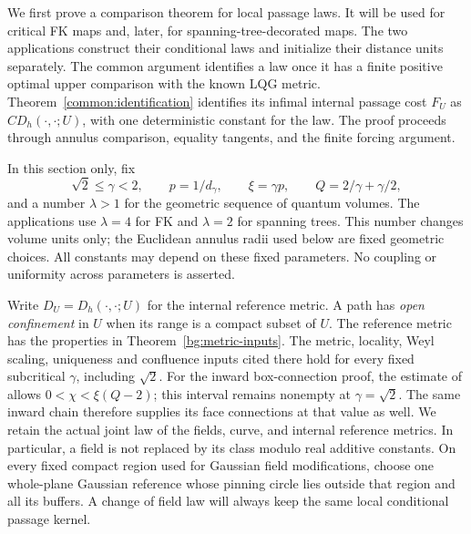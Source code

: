 We first prove a comparison theorem for local passage laws.  It will be
used for critical FK maps and, later, for spanning-tree-decorated maps.
The two applications construct their conditional laws and initialize their
distance units separately.  The common argument identifies a law once it
has a finite positive optimal upper comparison with the known LQG metric.
Theorem~\ref{common:identification} identifies its infimal internal
passage cost $F_U$ as $C D_h(\cdot,\cdot;U)$, with one deterministic
constant for the law. The proof proceeds through annulus comparison,
equality tangents, and the finite forcing argument.

In this section only, fix
\[
 \sqrt2\le\gamma<2,\qquad p=1/d_\gamma,\qquad
 \xi=\gamma p,\qquad Q=2/\gamma+\gamma/2,
\]
and a number $\lambda>1$ for the geometric sequence of quantum volumes.
The applications use $\lambda=4$ for FK and $\lambda=2$ for spanning
trees.  This number changes volume units only; the Euclidean annulus
radii used below are fixed geometric choices.  All constants may depend
on these fixed parameters.  No coupling or uniformity across parameters
is asserted.

Write $D_U=D_h(\cdot,\cdot;U)$ for the internal reference metric.
A path has \emph{open confinement} in $U$ when its range is a compact
subset of $U$.  The reference metric has the properties in
Theorem~\ref{bg:metric-inputs}.  The metric, locality, Weyl scaling,
uniqueness and confluence inputs cited there hold for every fixed
subcritical $\gamma$, including $\sqrt2$.  For the inward
box-connection proof, the estimate of
\cite[Lemma~3.20, Equations~(3.66)--(3.67)]{DFGPSWeakMetric}
allows $0<\chi<\xi(Q-2)$; this interval remains nonempty at
$\gamma=\sqrt2$.  The same inward chain therefore supplies its face
connections at that value as well.  We retain the actual
joint law of the fields, curve, and internal reference metrics.
In particular, a field is not replaced by its class modulo real additive
constants.  On every fixed compact region used for Gaussian field
modifications, choose one whole-plane Gaussian reference whose pinning
circle lies outside that region and all its buffers.  A change of field
law will always keep the same local conditional passage kernel.

